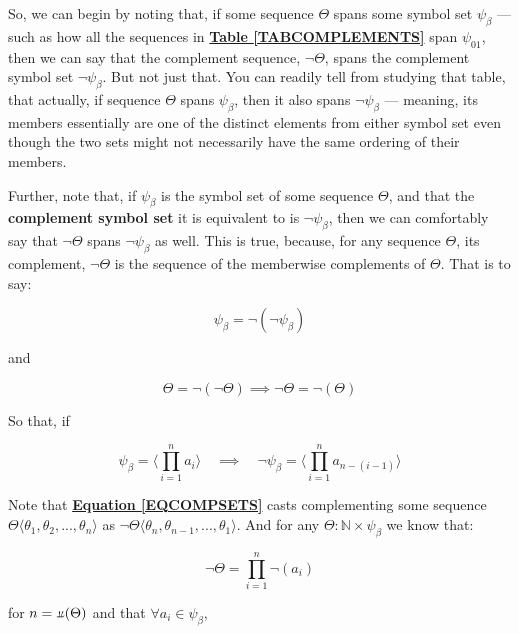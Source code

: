 \documentclass[a4paper, 18pt]{book} %
\newcommand{\invpi}{\rotatebox[origin=c]{180}{$\pi$}}
\begin{document}
So, we can begin by noting that, if some sequence $\Theta$ spans some symbol set $\psi_\beta$ --- such as how all the sequences in \textbf{\hyperref[TABCOMPLEMENTS]{Table \ref{TABCOMPLEMENTS}}} span $\psi_{01}$, then we can say that the complement sequence, $\lnot\Theta$, spans the complement symbol set $\lnot\psi_\beta$. But not just that. You can readily tell from studying that table, that actually, if sequence $\Theta$ spans $\psi_\beta$, then it also spans $\lnot\psi_\beta$ --- meaning, its members essentially are one of the distinct elements from either symbol set even though the two sets might not necessarily have the same ordering of their members.

Further, note that, if $\psi_\beta$ is the symbol set of some sequence $\Theta$, and that the \textbf{complement symbol set} it is equivalent to is $\lnot\psi_\beta$, then we can comfortably say that $\lnot\Theta$ spans $\lnot\psi_\beta$ as well. This is true, because, for any sequence $\Theta$, its complement, $\lnot\Theta$ is the sequence of the memberwise complements of $\Theta$. That is to say:

\begin{equation}
\psi_\beta = \lnot (\lnot \psi_\beta)
\end{equation}

and 

\begin{equation}
\Theta = \lnot(\lnot\Theta) \implies \lnot\Theta = \lnot(\Theta)
\end{equation}

So that, if

\begin{equation}
\label{EQCOMPSETS}
\psi_\beta = \langle \prod\limits_{i=1}^{n} a_i \rangle \quad \implies \quad \lnot\psi_\beta = \langle \prod\limits_{i=1}^{n} a_{n-(i-1)} \rangle
\end{equation}

Note that \textbf{\hyperref[EQCOMPSETS]{Equation \ref{EQCOMPSETS}}} casts complementing some sequence $\Theta\langle\theta_1,\theta_2,...,\theta_n \rangle$ as $\lnot\Theta\langle\theta_n,\theta_{n-1},...,\theta_1 \rangle$.  And for any $\Theta: \mathbb{N} \times \psi_\beta$ we know that:

\begin{equation}
\lnot\Theta = \prod\limits_{i=1}^{n} \lnot(a_i)
\end{equation}

for $n = \invpi(\Theta)$ and that $\forall a_i \in \psi_\beta$, 
\end{document}
